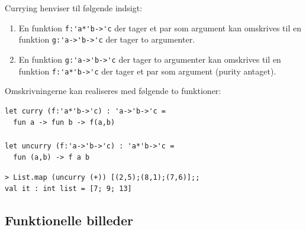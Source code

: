 \documentclass[rgb]{beamer}
\begin{document}
\begin{frame}[fragile]
\begin{footnotesize}

  Currying henviser til følgende indsigt:
  \begin{enumerate}
  \item En funktion \lstinline{f:'a*'b->'c} der tager et par som argument kan omskrives til en funktion \lstinline{g:'a->'b->'c} der tager to argumenter.
  \item En funktion \lstinline{g:'a->'b->'c} der tager to argumenter kan omskrives til en funktion \lstinline{f:'a*'b->'c} der tager et par som argument (purity antaget).
  \end{enumerate}

  Omskrivningerne kan realiseres med følgende to funktioner:

\begin{lstlisting}[numbers=none,frame=none,mathescape]
let curry (f:'a*'b->'c) : 'a->'b->'c =
  fun a -> fun b -> f(a,b)

let uncurry (f:'a->'b->'c) : 'a*'b->'c =
  fun (a,b) -> f a b
\end{lstlisting}

\begin{lstlisting}[numbers=none,frame=none,mathescape]
> List.map (uncurry (+)) [(2,5);(8,1);(7,6)];;
val it : int list = [7; 9; 13]
\end{lstlisting}

\end{footnotesize}
\end{frame}

\subsection{Funktionelle billeder}
\end{document}
